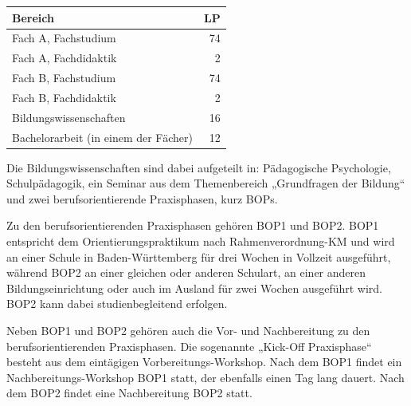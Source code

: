 \begin{table}[htb]
	\begin{tabular*}{\linewidth}{lr}
		\toprule
		Bereich & \gls{LP}\\
		\midrule
		Fach A, Fachstudium & 74\\
		Fach A, Fachdidaktik & \phantom{0}2\\
		\addlinespace
		Fach B, Fachstudium & 74\\
		Fach B, Fachdidaktik & \phantom{0}2\\
		\addlinespace
		Bildungswissenschaften & 16\\
		\addlinespace
		Bachelorarbeit (in einem der Fächer) & 12\\
		\bottomrule
	\end{tabular*}
	\vspace{-4mm}
\end{table}


Die Bildungswissenschaften sind dabei aufgeteilt in: Pä\-da\-go\-gische Psychologie, Schulpädagogik, ein Seminar aus dem Themenbereich „Grundfragen der Bildung“ und  zwei berufsorientierende Praxisphasen, kurz BOPs.


Zu den berufsorientierenden Praxisphasen gehören BOP1 und BOP2. BOP1 entspricht dem Orientierungspraktikum nach Rahmenverordnung-KM und wird an einer Schule in Baden-Württemberg für drei Wochen in Vollzeit ausgeführt, während BOP2 an einer gleichen oder anderen Schulart, an einer anderen Bildungseinrichtung oder auch im Ausland für zwei Wochen ausgeführt wird. BOP2 kann dabei studienbegleitend erfolgen.

Neben \gls{BOP}1 und \gls{BOP}2 gehören auch die Vor- und Nachbereitung zu den berufsorientierenden Praxisphasen. Die sogenannte „Kick-Off Praxisphase“ besteht aus dem eintägigen Vorbereitungs-Workshop. Nach dem BOP1 findet ein Nachbereitungs-Workshop BOP1 statt, der ebenfalls einen Tag lang dauert. Nach dem BOP2 findet eine Nachbereitung BOP2 statt.

